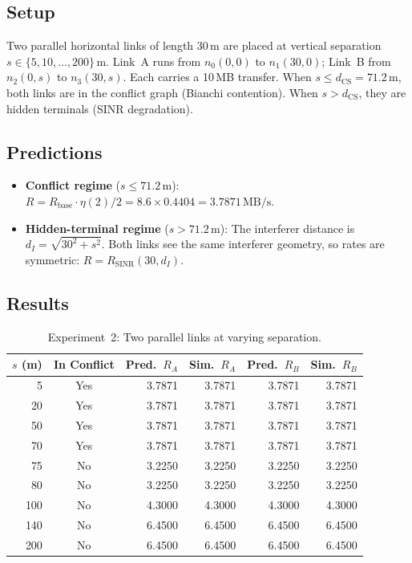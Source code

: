 \documentclass[11pt,a4paper]{article}
\newcommand{\MBs}{\,\text{MB/s}}
\begin{document}
\subsection{Setup}
Two parallel horizontal links of length 30\,m are placed at vertical separation $s \in \{5, 10, \ldots, 200\}\,$m. Link~A runs from $n_0(0,0)$ to $n_1(30,0)$; Link~B from $n_2(0,s)$ to $n_3(30,s)$. Each carries a 10\,MB transfer. When $s \leq d_{\text{CS}} = 71.2\,$m, both links are in the conflict graph (Bianchi contention). When $s > d_{\text{CS}}$, they are hidden terminals (SINR degradation).

\subsection{Predictions}
\begin{itemize}    \item \textbf{Conflict regime} ($s \leq 71.2\,$m): $R = R_{\text{base}} \cdot \eta(2)/2 = 8.6 \times 0.4404 = 3.7871\MBs$.
    \item \textbf{Hidden-terminal regime} ($s > 71.2\,$m): The interferer distance is $d_I = \sqrt{30^2 + s^2}$. Both links see the same interferer geometry, so rates are symmetric: $R = R_{\text{SINR}}(30, d_I)$.
\end{itemize}

\subsection{Results}

\begin{table}[h]
\centering
\caption{Experiment~2: Two parallel links at varying separation.}
\label{tab:exp2}
\begin{tabular}{rcrrrr}
\toprule
$s$ (m) & In Conflict & Pred.\ $R_A$ & Sim.\ $R_A$ & Pred.\ $R_B$ & Sim.\ $R_B$ \\
\midrule
  5 & Yes & 3.7871 & 3.7871 & 3.7871 & 3.7871 \\
 20 & Yes & 3.7871 & 3.7871 & 3.7871 & 3.7871 \\
 50 & Yes & 3.7871 & 3.7871 & 3.7871 & 3.7871 \\
 70 & Yes & 3.7871 & 3.7871 & 3.7871 & 3.7871 \\
 75 & No  & 3.2250 & 3.2250 & 3.2250 & 3.2250 \\
 80 & No  & 3.2250 & 3.2250 & 3.2250 & 3.2250 \\
100 & No  & 4.3000 & 4.3000 & 4.3000 & 4.3000 \\
140 & No  & 6.4500 & 6.4500 & 6.4500 & 6.4500 \\
200 & No  & 6.4500 & 6.4500 & 6.4500 & 6.4500 \\
\bottomrule
\end{tabular}
\end{table}
\end{document}
